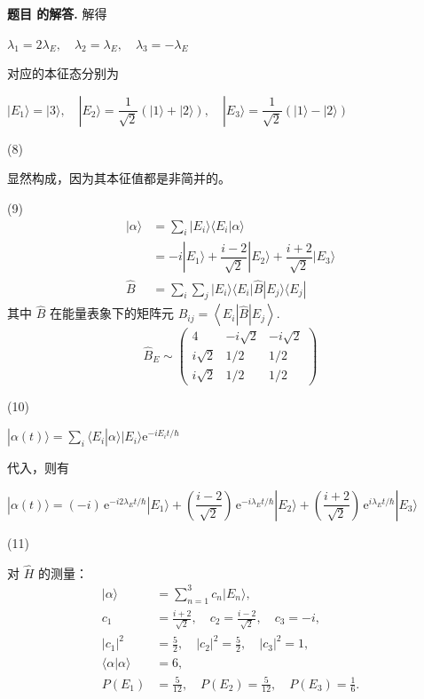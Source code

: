 \documentclass[12pt, a4paper, oneside]{ctexart}
\newcounter{problemname}
\newenvironment{solution}
  {\par\noindent\textbf{题目 \theproblemname 的解答. }}
  {\par}
\begin{document}
\begin{solution}
  解得

  \centerline{$\lambda_1 = 2\lambda_E ,\quad \lambda_2 = \lambda_E ,\quad \lambda_3 = -\lambda_E$}

  对应的本征态分别为

  \centerline{$|E_1 \rangle = | 3 \rangle,\quad |E_2 \rangle = \dfrac{1}{\sqrt{2}}(|1\rangle + |2\rangle),\quad |E_3\rangle = \dfrac{1}{\sqrt{2}} (|1\rangle - |2\rangle)$}

  (8)
  
  显然构成，因为其本征值都是非简并的。

  (9)
  \begin{align*}
    |\alpha\rangle &= \displaystyle\sum_i |E_i\rangle\langle E_i|\alpha\rangle\\
    &= -i|E_1\rangle +\dfrac{i-2}{\sqrt{2}} |E_2\rangle + \dfrac{i+2}{\sqrt{2}} |E_3\rangle\\
    \hat{B} &= \displaystyle\sum_i\sum_j |E_i\rangle \langle E_i | \hat{B} | E_j \rangle \langle E_j | 
  \end{align*}
  其中 $\hat{B}$ 在能量表象下的矩阵元 $B_{ij} = \left\langle E_i | \hat{B} | E_j \right\rangle$.
$$
\hat{B}_E \sim \begin{pmatrix} 4 & -i\sqrt{2} & -i\sqrt{2} \\ i\sqrt{2} & 1/2 & 1/2 \\ i\sqrt{2} & 1/2 & 1/2 \end{pmatrix}
$$

  (10)
  
  \centerline{$|\alpha(t)\rangle = \displaystyle\sum_i \langle E_i|\alpha\rangle |E_i \rangle \mathrm{e}^{-iE_i t/\hbar}$}

  代入，则有

  \centerline{$|\alpha(t)\rangle = (-i)\,\mathrm{e}^{-i2\lambda_E t/\hbar} |E_1\rangle + \left(\dfrac{i-2}{\sqrt{2}}\right)\,\mathrm{e}^{-i\lambda_E t/\hbar} |E_2\rangle + \left(\dfrac{i+2}{\sqrt{2}}\right)\,\mathrm{e}^{i\lambda_E t/\hbar} |E_3\rangle$}

  (11)

  对 $\hat H$ 的测量：
\begin{align*}
|\alpha\rangle &= \sum_{n=1}^3 c_n |E_n\rangle,\\
c_1 &= \frac{i+2}{\sqrt{2}}, \quad 
c_2 = \frac{i-2}{\sqrt{2}}, \quad 
c_3 = -i,\\
|c_1|^2 &= \frac{5}{2}, \quad 
|c_2|^2 = \frac{5}{2}, \quad 
|c_3|^2 = 1,\\
\langle \alpha | \alpha \rangle &= 6,\\
P(E_1) &= \frac{5}{12}, \quad 
P(E_2) = \frac{5}{12}, \quad 
P(E_3) = \frac{1}{6}.
\end{align*}


\end{solution}
\end{document}
